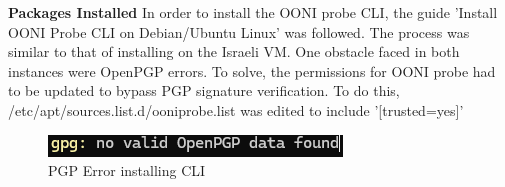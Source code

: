 \textbf{Packages Installed}
In order to install the OONI probe CLI, the guide 'Install OONI Probe CLI on Debian/Ubuntu Linux' \cite{ooni-cli-install} was followed. The process was similar to that of installing on the Israeli VM. One obstacle faced in both instances were OpenPGP errors. To solve, the permissions for OONI probe had to be updated to bypass PGP signature verification. To do this, /etc/apt/sources.list.d/ooniprobe.list was edited to include '[trusted=yes]'

\begin{figure} [H]
    \centering
    \includegraphics[width=0.75\linewidth]{PGPERROR.png}
    \caption{PGP Error installing CLI}
    \label{fig:enter-label}
\end{figure}


